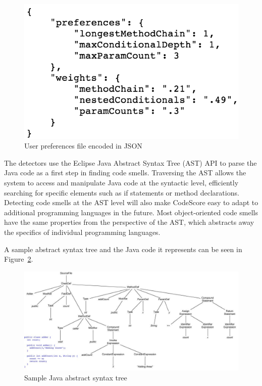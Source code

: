 \documentclass{sig-alternate}
\begin{document}
\begin{figure}[ht]
	\begin{center}
		\includegraphics[width=0.9\linewidth]{json}
	\end{center}
	\vspace{-12pt}
	\caption{User preferences file encoded in JSON}
	\label{fig: json}
\end{figure}


The detectors use the Eclipse Java Abstract Syntax Tree (AST) API to parse the Java code
as a first step in finding code smells. Traversing the AST allows the system to access and manipulate Java code
at the syntactic level, efficiently searching for specific elements such as if
statements or method declarations. Detecting code smells at the AST level will
also make CodeScore easy to adapt to additional programming languages in the future.
Most object-oriented code smells have the same properties from the perspective of the AST,
which abstracts away the specifics of individual programming languages. 

A sample abstract syntax tree and the Java code it represents can be seen in Figure~\ref{fig: ast}.

\begin{figure}[ht]
	\begin{center}
		\includegraphics[width=0.9\linewidth]{syntax_tree}
	\end{center}
	\vspace{-12pt}
	\caption{Sample Java abstract syntax tree}
	\label{fig: ast}
\end{figure}
\end{document}
